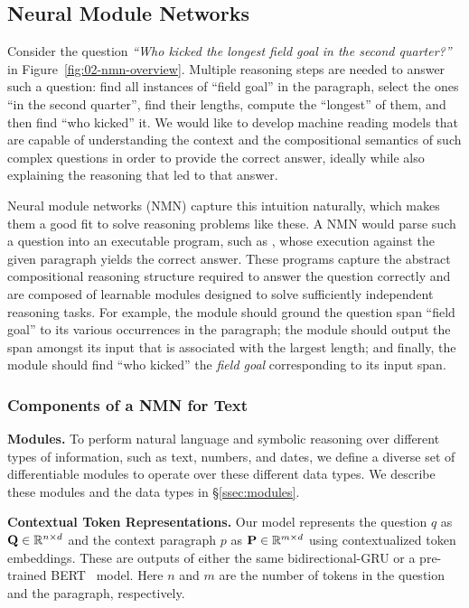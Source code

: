 \documentclass[main.tex]{subfiles}
\begin{document}
\subsection{Neural Module Networks}
\label{ssec:background}
Consider the question \textit{``Who kicked the longest field goal in the second quarter?''} in Figure~\ref{fig:02-nmn-overview}. Multiple reasoning steps are needed to answer such a question: find all instances of ``field goal'' in the paragraph, select the ones ``in the second quarter'', find their lengths, compute the ``longest'' of them, and then find ``who kicked'' it.
We would like to develop machine reading models that are capable of understanding the context and the compositional semantics of such complex questions in order to provide the correct answer, ideally while also explaining the reasoning that led to that answer.

Neural module networks (NMN) capture this intuition naturally, which makes them a good fit to solve reasoning problems like these.
A NMN would parse such a question into an executable program, such as , whose execution against the given paragraph yields the correct answer.  These programs capture the abstract compositional reasoning structure required to answer the question correctly and are composed of learnable modules designed to solve sufficiently independent reasoning tasks.  For example, the  module should ground the question span ``field goal'' to its various occurrences in the paragraph; the module  should output the span amongst its input that is associated with the largest length; and finally, the  module should find ``who kicked'' the \textit{field goal} corresponding to its input span.

\subsubsection{Components of a NMN for Text}
\label{sssec:components}

\textbf{Modules.}
To perform natural language and symbolic reasoning over different types of information, such as text, numbers, and dates, we define a diverse set of differentiable modules to operate over these different data types.  We describe these modules and the data types in \S\ref{ssec:modules}.

\textbf{Contextual Token Representations.}
Our model represents the question $q$ as $\mathbf{Q} \in \mathbb{R}^{n \times d}$ and the context paragraph $p$ as $\mathbf{P} \in \mathbb{R}^{m \times d}$ using contextualized token embeddings. These are outputs of either the same bidirectional-GRU or a pre-trained BERT~\cite{bert-2018} model. Here $n$ and $m$ are the number of tokens in the question and the paragraph, respectively.
\end{document}
